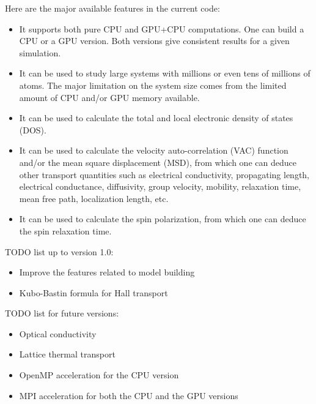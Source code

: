 \documentclass[12pt,a4paper]{report}
\begin{document}
Here are the major available features in the current code:
\begin{itemize}
\item It supports both pure CPU and GPU+CPU computations. One can build a CPU or a GPU version. Both versions give consistent results for a given simulation.
\item It can be used to study large systems with millions or even tens of millions of atoms. The major limitation on the system size comes from the limited amount of CPU and/or GPU memory available.
\item It can be used to calculate the total and local electronic density of states (DOS).
\item It can be used to calculate the velocity auto-correlation (VAC) function and/or the mean square displacement (MSD), from which one can deduce other transport quantities such as electrical conductivity, propagating length, electrical conductance, diffusivity, group velocity, mobility, relaxation time, mean free path, localization length, etc.
\item It can be used to calculate the spin polarization, from which one can deduce the spin relaxation time.
\end{itemize}

TODO list up to version 1.0:
\begin{itemize}
\item Improve the features related to model building
\item Kubo-Bastin formula for Hall transport
\end{itemize}


TODO list for future versions:
\begin{itemize}
\item Optical conductivity
\item Lattice thermal transport
\item OpenMP acceleration for the CPU version
\item MPI acceleration for both the CPU and the GPU versions
\end{itemize}
\end{document}

